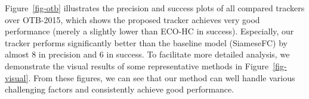 \documentclass[10pt,twocolumn,letterpaper]{article}
\begin{document}
\begin{table}[t]
	\centering
	\caption{The accuracy (A), robustness (R) and expected average overlap
		(EAO) scores of different trackers on VOT2017.}
	\vspace{1mm}
		\label{vot-table}
	\end{table}



Figure~\ref{fig-otb} illustrates the precision and success plots of all compared trackers
over OTB-2015, which shows the proposed tracker achieves very good performance
(merely a slightly lower than ECO-HC in success).
Especially, our tracker performs significantly better than the baseline model
(SiameseFC) by almost 8 in precision and 6 in success.
To facilitate more detailed analysis, we demonstrate the visual
results of some representative methods in Figure~\ref{fig-visual}.
From these figures, we can see that our method can well handle various challenging
factors and consistently achieve good performance.
\end{document}
